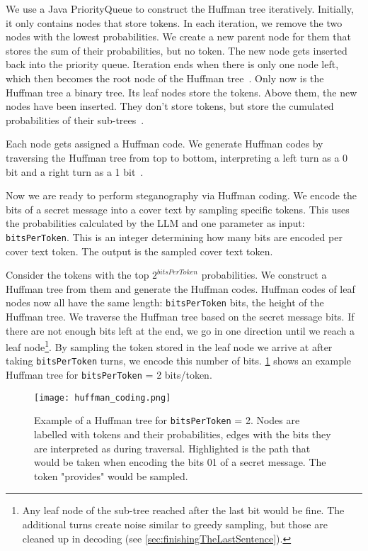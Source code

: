 We use a Java PriorityQueue to construct the Huffman tree iteratively. Initially, it only contains nodes that store tokens. In each iteration, we remove the two nodes with the lowest probabilities. We create a new parent node for them that stores the sum of their probabilities, but no token. The new node gets inserted back into the priority queue. Iteration ends when there is only one node left, which then becomes the root node of the Huffman tree~\cite{huffmanMethodConstructionMinimumRedundancy1952}. Only now is the Huffman tree a binary tree. Its leaf nodes store the tokens. Above them, the new nodes have been inserted. They don't store tokens, but store the cumulated probabilities of their sub-trees~\cite{huffmanMethodConstructionMinimumRedundancy1952}.

Each node gets assigned a Huffman code. We generate Huffman codes by traversing the Huffman tree from top to bottom, interpreting a left turn as a 0 bit and a right turn as a 1 bit~\cite{huffmanMethodConstructionMinimumRedundancy1952}.

Now we are ready to perform steganography via Huffman coding. We encode the bits of a secret message into a cover text by sampling specific tokens. This uses the probabilities calculated by the \gls{LLM} and one parameter as input: \lstinline|bitsPerToken|. This is an integer determining how many bits are encoded per cover text token. The output is the sampled cover text token.

Consider the tokens with the top $ 2^{bitsPerToken} $ probabilities. We construct a Huffman tree from them and generate the Huffman codes. Huffman codes of leaf nodes now all have the same length: \lstinline|bitsPerToken| bits, the height of the Huffman tree. We traverse the Huffman tree based on the secret message bits. If there are not enough bits left at the end, we go in one direction until we reach a leaf node\footnote{Any leaf node of the sub-tree reached after the last bit would be fine. The additional turns create noise similar to greedy sampling, but those are cleaned up in decoding (see \cref{sec:finishingTheLastSentence}).}. By sampling the token stored in the leaf node we arrive at after taking \lstinline|bitsPerToken| turns, we encode this number of bits. \cref{fig:huffmanCoding} shows an example Huffman tree for \lstinline|bitsPerToken| = 2 bits/token.

\begin{figure}
    \centering
    \captionsetup{width=\linewidth}
    \texttt{[image: huffman\_coding.png]}
    \caption[Huffman coding]{Example of a Huffman tree for \lstinline|bitsPerToken| = 2. Nodes are labelled with tokens and their probabilities, edges with the bits they are interpreted as during traversal. Highlighted is the path that would be taken when encoding the bits 01 of a secret message. The token "provides" would be sampled.}
    \label{fig:huffmanCoding}
\end{figure}

